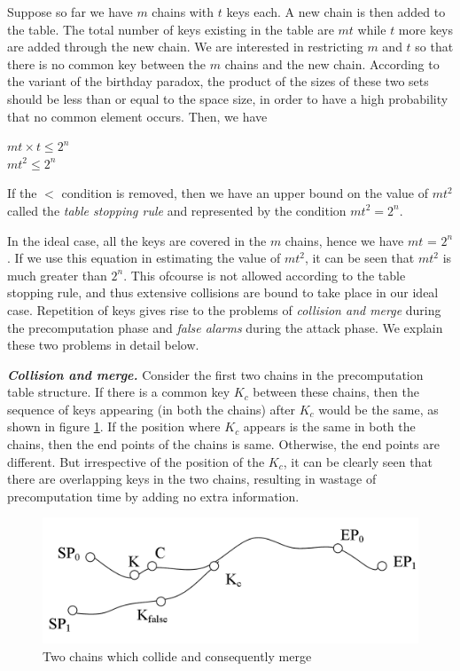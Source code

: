 \begin{enumerate}
Suppose so far we have $m$ chains with $t$ keys each. A new chain is then added to the table. The total number of keys existing in the table are $mt$ while $t$ more keys are added through the new chain. We are interested in restricting $m$ and $t$ so that there is no common key between the $m$ chains and the new chain. According to the variant of the birthday paradox, the product of the sizes of these two sets should be less than or equal to the space size, in order to have a high probability that no common element occurs. Then, we have 

\begin{center}
$mt \times t \leq 2^n$\\
$mt^2 \leq 2^n$\\
\end{center}

If the $<$ condition is removed, then we have an upper bound on the value of $mt^2$ called the \emph{table stopping rule} and represented by the condition 
$mt^2 = 2^n$. 

In the ideal case, all the keys are covered in the $m$ chains, hence we have $mt$ = $2^n$. If we use this equation in estimating the value of $mt^2$, it can be seen that $mt^2$ is much greater than $2^n$. This ofcourse is not allowed according to the table stopping rule, and thus extensive collisions are bound to take place in our ideal case. Repetition of keys gives rise to the problems of \emph{collision and merge} during the precomputation phase and \emph{false alarms} during the attack phase. We explain these two problems in detail below.
\end{enumerate}

\noindent \textit{\textbf{Collision and merge.}} Consider the first two chains in the precomputation table structure. If there is a common key $K_c$ between these chains, then the sequence of keys appearing (in both the chains) after $K_c$ would be the same, as shown in figure \ref{fig:collision-merge}. If the position where $K_c$ appears is the same in both the chains, then the end points of the chains is same. Otherwise, the end points are different. But irrespective of the position of the $K_c$, it can be clearly seen that there are overlapping keys in the two chains, resulting in wastage of precomputation time by adding no extra information.\\

\begin{figure}[ht!]
	\centering
		\includegraphics[width=4.5in]{./figures/collision-merge.PNG}
	\caption{Two chains which collide and consequently merge}	
	\label{fig:collision-merge}
\end{figure}

